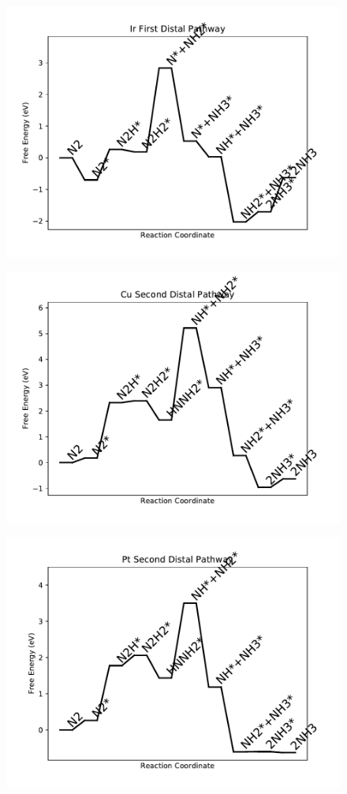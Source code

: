 \begin{figure}
\includegraphics[width=0.8\linewidth]{data/plots/Ir_distal_1.pdf}
\end{figure}

\begin{figure}
\includegraphics[width=0.8\linewidth]{data/plots/Cu_distal_2.pdf}
\end{figure}

\begin{figure}
\includegraphics[width=0.8\linewidth]{data/plots/Pt_distal_2.pdf}
\end{figure}

